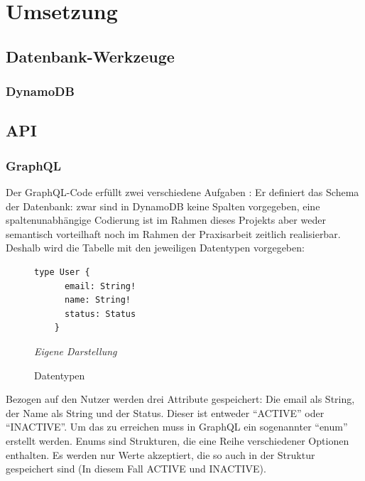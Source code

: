 

\section{Umsetzung}
\subsection{Datenbank-Werkzeuge}
\subsubsection{DynamoDB}
\subsection{API}
\subsubsection{GraphQL}
Der GraphQL-Code erfüllt zwei verschiedene Aufgaben \cite{GraphQLAWSAppSync2024}: Er definiert das Schema der Datenbank: zwar sind in DynamoDB keine Spalten vorgegeben, eine spaltenunabhängige Codierung ist im Rahmen dieses Projekts aber weder semantisch vorteilhaft noch im Rahmen der Praxisarbeit zeitlich realisierbar. Deshalb wird die Tabelle mit den jeweiligen Datentypen vorgegeben:

	\begin{figure}[H]
	\centering
	\begin{minipage}[t]{.7\textwidth} %
	\caption{Datentypen} %
	\begin{lstlisting}[style=graphql]
	type User {
	  email: String!
	  name: String!
	  status: Status
	}
	\end{lstlisting}
	\textit{Eigene Darstellung} %
	\label{fig:datenTypen}
	\end{minipage}
	\end{figure}
Bezogen auf den Nutzer werden drei Attribute gespeichert: Die email als String, der Name als String und der Status. Dieser ist entweder ``ACTIVE'' oder ``INACTIVE''. Um das zu erreichen muss in GraphQL ein sogenannter ``enum'' erstellt werden. Enums sind Strukturen, die eine Reihe verschiedener Optionen enthalten. Es werden nur Werte akzeptiert, die so auch in der Struktur gespeichert sind (In diesem Fall ACTIVE und INACTIVE). \cite{https://graphql.com/learn/enums/}

